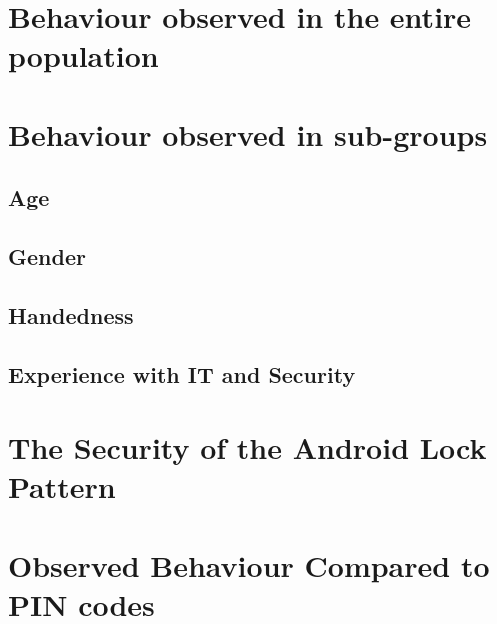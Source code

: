 	\clearpage

	\section{Behaviour observed in the entire population}


	\section{Behaviour observed in sub-groups}

		\subsection{Age}

		\subsection{Gender}

		\subsection{Handedness}

		\subsection{Experience with IT and Security}

	\section{The Security of the Android Lock Pattern}

	\section{Observed Behaviour Compared to PIN codes}

